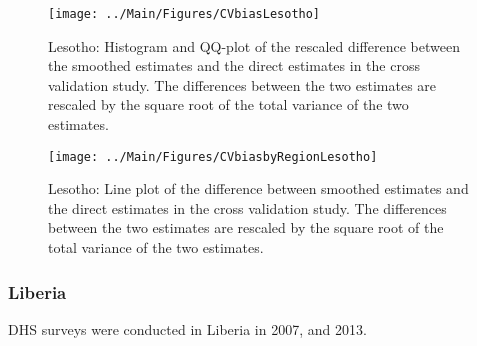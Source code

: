 \documentclass[12pt]{article}\usepackage[]{graphicx}\usepackage[]{color}
\newenvironment{knitrout}{}{} %
\begin{document}
\begin{knitrout}
\color{fgcolor}\begin{figure}[bht]

{\centering \texttt{[image: ../Main/Figures/CVbiasLesotho]} 

}

\caption[Lesotho]{Lesotho: Histogram and QQ-plot of the rescaled difference between the smoothed estimates and the direct estimates in the cross validation study. The differences between the two estimates are rescaled by the square root of the total variance of the two estimates.}\label{fig:unnamed-chunk-179}
\end{figure}


\end{knitrout}

\begin{knitrout}
\color{fgcolor}\begin{figure}[bht]

{\centering \texttt{[image: ../Main/Figures/CVbiasbyRegionLesotho]} 

}

\caption[Lesotho]{Lesotho: Line plot of the difference between smoothed estimates and the direct estimates in the cross validation study. The differences between the two estimates are rescaled by the square root of the total variance of the two estimates.}\label{fig:unnamed-chunk-180}
\end{figure}


\end{knitrout}


\clearpage
\subsubsection{Liberia}





DHS surveys were conducted in Liberia in 2007, and 2013.
\end{document}
